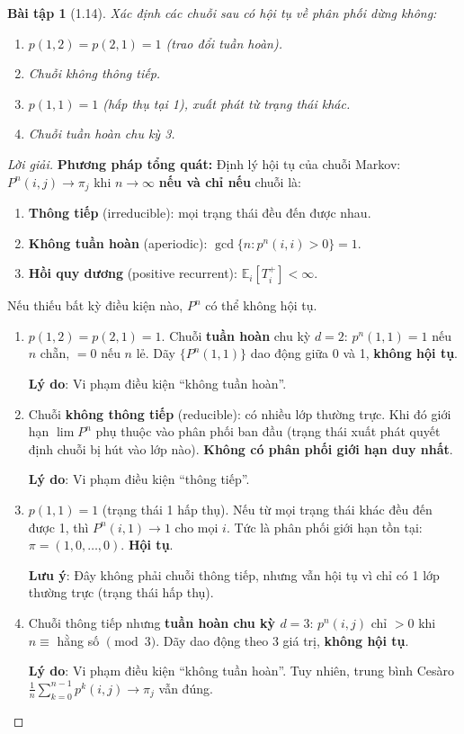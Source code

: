 \documentclass[8pt,a4paper]{article}
\newtheorem{exercise}{Bài tập}
\newenvironment{solution}{\begin{proof}[Lời giải]}{\end{proof}}
\newcommand{\E}{\mathbb{E}}
\begin{document}
\begin{exercise}[1.14]
Xác định các chuỗi sau có hội tụ về phân phối dừng không:
\begin{enumerate}[label=(\alph*)]
\item $p(1,2) = p(2,1) = 1$ (trao đổi tuần hoàn).
\item Chuỗi không thông tiếp.
\item $p(1,1) = 1$ (hấp thụ tại 1), xuất phát từ trạng thái khác.
\item Chuỗi tuần hoàn chu kỳ 3.
\end{enumerate}
\end{exercise}
\begin{solution}
\textbf{Phương pháp tổng quát:} Định lý hội tụ của chuỗi Markov: $P^n(i,j) \to \pi_j$ khi $n\to\infty$ \textbf{nếu và chỉ nếu} chuỗi là:
\begin{enumerate}
  \item \textbf{Thông tiếp} (irreducible): mọi trạng thái đều đến được nhau.
  \item \textbf{Không tuần hoàn} (aperiodic): $\gcd\{n: p^n(i,i)>0\} = 1$.
  \item \textbf{Hồi quy dương} (positive recurrent): $\E_i[T_i^+] < \infty$.
\end{enumerate}
Nếu thiếu bất kỳ điều kiện nào, $P^n$ có thể không hội tụ.

\begin{enumerate}[label=(\alph*)]
\item $p(1,2) = p(2,1) = 1$. Chuỗi \textbf{tuần hoàn} chu kỳ $d = 2$: $p^n(1,1) = 1$ nếu $n$ chẵn, $= 0$ nếu $n$ lẻ. Dãy $\{P^n(1,1)\}$ dao động giữa 0 và 1, \textbf{không hội tụ}.

\textbf{Lý do}: Vi phạm điều kiện ``không tuần hoàn''.

\item Chuỗi \textbf{không thông tiếp} (reducible): có nhiều lớp thường trực. Khi đó giới hạn $\lim P^n$ phụ thuộc vào phân phối ban đầu (trạng thái xuất phát quyết định chuỗi bị hút vào lớp nào). \textbf{Không có phân phối giới hạn duy nhất}.

\textbf{Lý do}: Vi phạm điều kiện ``thông tiếp''.

\item $p(1,1) = 1$ (trạng thái 1 hấp thụ). Nếu từ mọi trạng thái khác đều đến được 1, thì $P^n(i,1) \to 1$ cho mọi $i$. Tức là phân phối giới hạn tồn tại: $\pi = (1, 0, \ldots, 0)$. \textbf{Hội tụ}.

\textbf{Lưu ý}: Đây không phải chuỗi thông tiếp, nhưng vẫn hội tụ vì chỉ có 1 lớp thường trực (trạng thái hấp thụ).

\item Chuỗi thông tiếp nhưng \textbf{tuần hoàn chu kỳ $d = 3$}: $p^n(i,j)$ chỉ $> 0$ khi $n \equiv$ hằng số $\pmod{3}$. Dãy dao động theo 3 giá trị, \textbf{không hội tụ}.

\textbf{Lý do}: Vi phạm điều kiện ``không tuần hoàn''. Tuy nhiên, trung bình Cesàro $\frac{1}{n}\sum_{k=0}^{n-1} p^k(i,j) \to \pi_j$ vẫn đúng.
\end{enumerate}
\end{solution}
\end{document}
